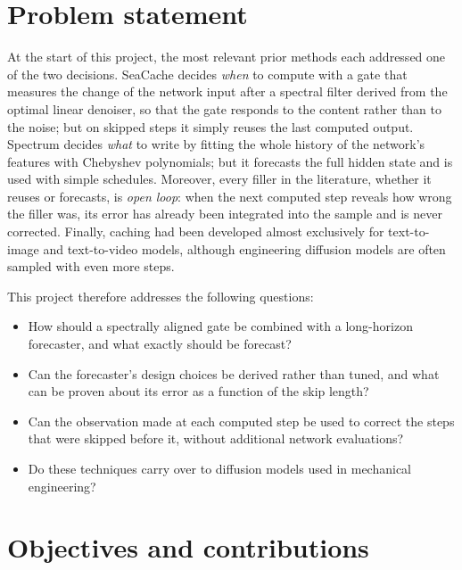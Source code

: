 \section{Problem statement}

At the start of this project, the most relevant prior methods each addressed one of the two decisions. SeaCache \citep{chung2026seacache} decides \emph{when} to compute with a gate that measures the change of the network input after a spectral filter derived from the optimal linear denoiser, so that the gate responds to the content rather than to the noise; but on skipped steps it simply reuses the last computed output. Spectrum \citep{han2026spectrum} decides \emph{what} to write by fitting the whole history of the network's features with Chebyshev polynomials; but it forecasts the full hidden state and is used with simple schedules. Moreover, every filler in the literature, whether it reuses or forecasts, is \emph{open loop}: when the next computed step reveals how wrong the filler was, its error has already been integrated into the sample and is never corrected. Finally, caching had been developed almost exclusively for text-to-image and text-to-video models, although engineering diffusion models are often sampled with even more steps.

This project therefore addresses the following questions:
\begin{itemize}
  \item How should a spectrally aligned gate be combined with a long-horizon forecaster, and what exactly should be forecast?
  \item Can the forecaster's design choices be derived rather than tuned, and what can be proven about its error as a function of the skip length?
  \item Can the observation made at each computed step be used to correct the steps that were skipped before it, without additional network evaluations?
  \item Do these techniques carry over to diffusion models used in mechanical engineering?
\end{itemize}

\section{Objectives and contributions}

